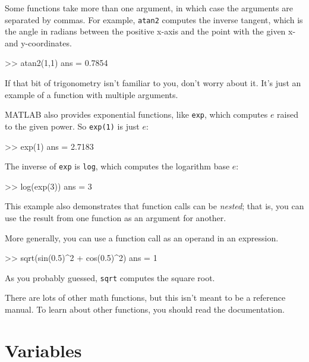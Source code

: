 Some functions take more than one argument, in which case the arguments are
separated by commas.  For example, \lstinline{atan2} computes the inverse
tangent, which is the angle in radians between the positive x-axis and
the point with the given x- and y-coordinates.

\begin{code}
>> atan2(1,1)
ans = 0.7854
\end{code}

If that bit of trigonometry isn't familiar to you, don't worry about
it.  It's just an example of a function with multiple arguments.


MATLAB also provides exponential functions, like \lstinline{exp}, which computes $e$ raised to the given power.  So \lstinline{exp(1)} is just $e$:

\begin{code}
>> exp(1)
ans = 2.7183
\end{code}


The inverse of \lstinline{exp} is \lstinline{log}, which computes the logarithm base $e$:

\begin{code}
>> log(exp(3))
ans = 3
\end{code}

This example also demonstrates that function calls can be \emph{nested};
that is, you can use the result from one function as an argument for
another.


More generally, you can use a function call as an operand in an \mbox{expression}.

\begin{code}
>> sqrt(sin(0.5)^2 + cos(0.5)^2)
ans = 1
\end{code}

As you probably guessed, \lstinline{sqrt} computes the square root.


There are lots of other math functions, but this isn't meant to
be a reference manual.  To learn about other functions, you should
read the documentation.


\section{Variables}

